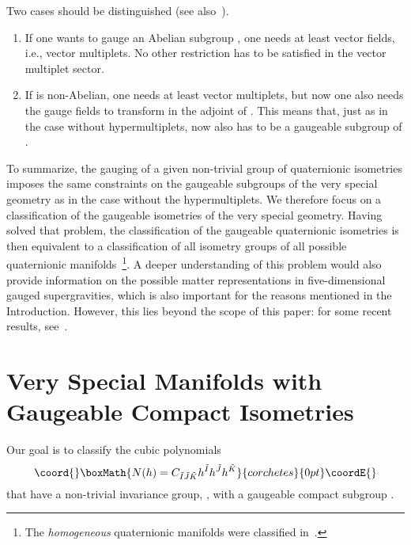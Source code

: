 \documentclass[a4paper,11pt]{article}
\providecommand{\ti}{\ensuremath{\tilde{I}}}
\providecommand{\tj}{\ensuremath{\tilde{J}}}
\providecommand{\tk}{\ensuremath{\tilde{K}}}
\providecommand{\M}{\ensuremath{\mathcal{M}}}
\begin{document}
Two cases should be distinguished (see also~\cite{CD,LOSW2,ABCDFF}).

\begin{enumerate}
\item If one wants to gauge an Abelian subgroup \myHighlight{$K\subset Iso(\M_{Q})$}\coordHE{},
one needs at least \coordHE{} vector fields, i.e.,
\coordHE{} vector multiplets. No other restriction has to
be satisfied in the vector multiplet sector.
\item
If \myHighlight{$K\subset Iso(\M_{Q})$}\coordHE{} is non-Abelian, one needs at 
least \coordHE{} vector 
multiplets, but now one also needs the gauge fields to 
transform in the adjoint of \coordHE{}. 
This  means that, just as in the case without hypermultiplets, \coordHE{} now also has to be a 
gaugeable subgroup of \coordHE{}.
\end{enumerate}

To summarize, the gauging of a given non-trivial group of quaternionic
isometries imposes the same constraints on the gaugeable subgroups of the
very special geometry as in the case without the hypermultiplets. We
therefore focus on a classification of the gaugeable isometries of the
very special geometry. Having solved that problem, the classification of
the gaugeable quaternionic isometries is then equivalent to a
classification of all isometry groups of all possible quaternionic
manifolds~\footnote{The \emph{homogeneous} quaternionic manifolds were
classified in~\cite{dWvP2}.}. A deeper understanding of this problem would
also provide information on the possible matter representations in
five-dimensional gauged supergravities, which is also important for the
reasons mentioned in the Introduction. However, this lies beyond the scope
of this paper: for some recent results, see~\cite{dWRV}. 



\section{Very Special Manifolds with Gaugeable Compact Isometries}
\setcounter{equation}{0}



Our goal is to classify the cubic polynomials
\begin{displaymath}\coord{}\boxMath{
N(h)=C_{\ti\tj\tk}h^{\ti}
h^{\tj}h^{\tk}
}{corchetes}{0pt}\coordE{}\end{displaymath}
that have a non-trivial invariance group, \coordHE{},  with a
gaugeable compact subgroup \coordHE{}.
\end{document}
